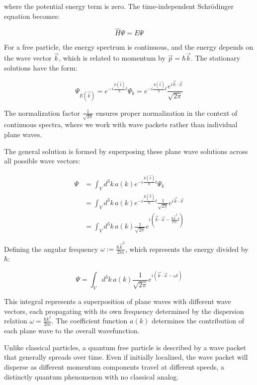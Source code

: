 where the potential energy term is zero. The time-independent Schrödinger equation becomes:

\begin{equation}
\hat{H}\Psi = E\Psi
\end{equation}

For a free particle, the energy spectrum is continuous, and the energy depends on the wave vector $\vec{k}$, which is related to momentum by $\vec{p} = \hbar\vec{k}$. The stationary solutions have the form:

\begin{equation}
\Psi_{E(\vec{k})} = e^{-i\frac{E(\vec{k})}{\hbar}t}\Psi_k = e^{-i\frac{E(\vec{k})}{\hbar}t}\frac{e^{i\vec{k}\cdot\vec{x}}}{\sqrt{2\pi}}
\end{equation}

The normalization factor $\frac{1}{\sqrt{2\pi}}$ ensures proper normalization in the context of continuous spectra, where we work with wave packets rather than individual plane waves.

The general solution is formed by superposing these plane wave solutions across all possible wave vectors:

\begin{align}
\Psi &= \int_V d^3k\,a(k)e^{-i\frac{E(\vec{k})}{\hbar}t}\Psi_k \\
&= \int_V d^3k\,a(k)e^{-i\frac{E(\vec{k})}{\hbar}t}\frac{1}{\sqrt{2\pi}}e^{i\vec{k}\cdot\vec{x}}  \\
&= \int_V d^3k\,a(k)\frac{1}{\sqrt{2\pi}}e^{i\left(\vec{k}\cdot\vec{x} - \frac{\hbar\vec{k}^2}{2m}t\right)}
\end{align}

Defining the angular frequency $\omega := \frac{\hbar\vec{k}^2}{2m}$, which represents the energy divided by $\hbar$:

\begin{equation}
\Psi = \int_V d^3k\,a(k)\frac{1}{\sqrt{2\pi}}e^{i(\vec{k}\cdot\vec{x} - \omega t)} \label{eq:3.6}
\end{equation}

This integral represents a superposition of plane waves with different wave vectors, each propagating with its own frequency determined by the dispersion relation $\omega = \frac{\hbar k^2}{2m}$. The coefficient function $a(k)$ determines the contribution of each plane wave to the overall wavefunction.

Unlike classical particles, a quantum free particle is described by a wave packet that generally spreads over time. Even if initially localized, the wave packet will disperse as different momentum components travel at different speeds, a distinctly quantum phenomenon with no classical analog.

